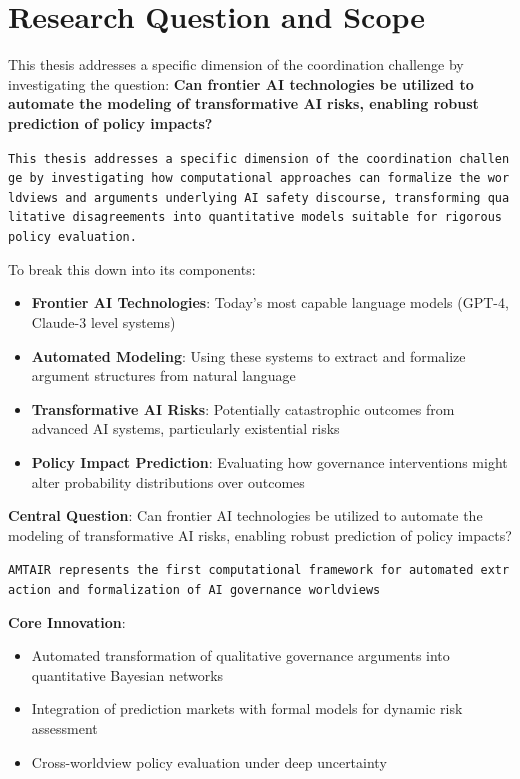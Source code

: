 \documentclass[
  11pt,
  letterpaper,
]{book}
\providecommand{\tightlist}{%
  \setlength{\itemsep}{0pt}\setlength{\parskip}{0pt}}
\begin{document}
\section{Research Question and Scope}\label{sec-research-question}

This thesis addresses a specific dimension of the coordination challenge
by investigating the question: \textbf{Can frontier AI technologies be
utilized to automate the modeling of transformative AI risks, enabling
robust prediction of policy impacts?}

\texttt{This\ thesis\ addresses\ a\ specific\ dimension\ of\ the\ coordination\ challenge\ by\ investigating\ how\ computational\ approaches\ can\ formalize\ the\ worldviews\ and\ arguments\ underlying\ AI\ safety\ discourse,\ transforming\ qualitative\ disagreements\ into\ quantitative\ models\ suitable\ for\ rigorous\ policy\ evaluation.}

To break this down into its components:

\begin{itemize}
\tightlist
\item
  \textbf{Frontier AI Technologies}: Today's most capable language
  models (GPT-4, Claude-3 level systems)
\item
  \textbf{Automated Modeling}: Using these systems to extract and
  formalize argument structures from natural language
\item
  \textbf{Transformative AI Risks}: Potentially catastrophic outcomes
  from advanced AI systems, particularly existential risks
\item
  \textbf{Policy Impact Prediction}: Evaluating how governance
  interventions might alter probability distributions over outcomes
\end{itemize}

\textbf{Central Question}: Can frontier AI technologies be utilized to
automate the modeling of transformative AI risks, enabling robust
prediction of policy impacts?

\texttt{AMTAIR\ represents\ the\ first\ computational\ framework\ for\ automated\ extraction\ and\ formalization\ of\ AI\ governance\ worldviews}

\textbf{Core Innovation}:

\begin{itemize}
\tightlist
\item
  Automated transformation of qualitative governance arguments into
  quantitative Bayesian networks
\item
  Integration of prediction markets with formal models for dynamic risk
  assessment
\item
  Cross-worldview policy evaluation under deep uncertainty
\end{itemize}
\end{document}
